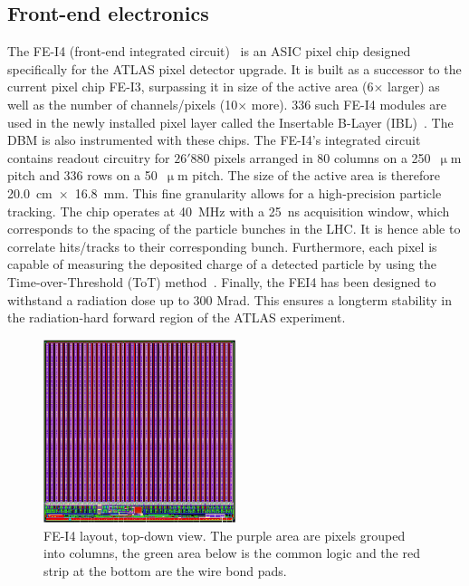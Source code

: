 \subsection{Front-end electronics}
The FE-I4 (front-end integrated circuit)~\cite{Albert:1477014} is an ASIC pixel chip designed specifically for the ATLAS pixel detector upgrade. It is built as a successor to the current pixel chip FE-I3, surpassing it in size of the active area (6$\times$ larger) as well as the number of channels/pixels (10$\times$ more). 336 such FE-I4 modules are used in the newly installed pixel layer called the Insertable B-Layer (IBL)~\cite{Huegging:1314083}. The DBM is also instrumented with these chips. The FE-I4's integrated circuit contains readout circuitry for $26'880$ pixels arranged in 80 columns on a 250~$\upmu$m pitch and 336 rows on a 50~$\upmu$m pitch. The size of the active area is therefore 20.0~cm~$\times$~16.8~mm. This fine granularity allows for a high-precision particle tracking. The chip operates at 40~MHz with a 25~ns acquisition window, which corresponds to the spacing of the particle bunches in the LHC. It is hence able to correlate hits/tracks to their corresponding bunch. Furthermore, each pixel is capable of measuring the deposited charge of a detected particle by using the Time-over-Threshold (ToT) method~\cite{ATLIBL:00001}. Finally, the FEI4 has been designed to withstand a radiation dose up to 300 Mrad. This ensures a longterm stability in the radiation-hard forward region of the ATLAS experiment.

\begin{figure}[!t]
\centering
\includegraphics[width=0.5\textwidth]{04_charge_monitoring/pics/fei41}
\caption{FE-I4 layout, top-down view. The purple area are pixels grouped into columns, the green area below is the common logic and the red strip at the bottom are the wire bond pads.}
\label{fig:anapix}
\end{figure}

